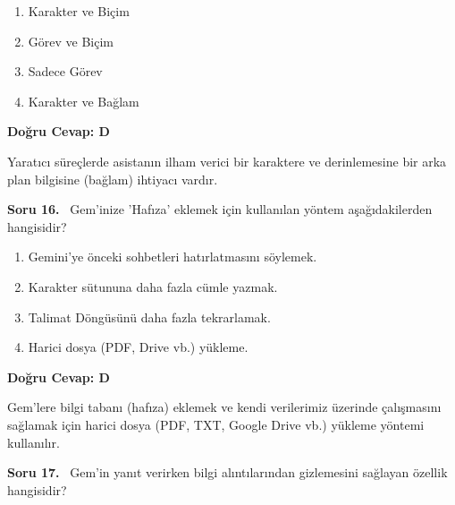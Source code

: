 \documentclass[11pt,a4paper,openany]{book}
\begin{document}
\begin{enumerate}[label=\Alph*), leftmargin=25pt, topsep=4pt, itemsep=2pt]
        \item Karakter ve Biçim
        \item Görev ve Biçim
        \item Sadece Görev
        \item Karakter ve Bağlam
\end{enumerate}

\vspace{4pt}
\begin{tcolorbox}[title=Cevap ve Açıklama, colback=gray!3!white, colframe=primarycolor!90!black, arc=2mm, fonttitle=\bfseries\sffamily, top=6pt, bottom=6pt]
    \textbf{Doğru Cevap: D}

    \vspace{2pt}
    Yaratıcı süreçlerde asistanın ilham verici bir karaktere ve derinlemesine bir arka plan bilgisine (bağlam) ihtiyacı vardır.
\end{tcolorbox}
\vspace{10pt}
\needspace{5cm}
\vspace{8pt}
\noindent\textbf{\large\sffamily Soru 16.} \ Gem'inize 'Hafıza' eklemek için kullanılan yöntem aşağıdakilerden hangisidir?

\begin{enumerate}[label=\Alph*), leftmargin=25pt, topsep=4pt, itemsep=2pt]
        \item Gemini'ye önceki sohbetleri hatırlatmasını söylemek.
        \item Karakter sütununa daha fazla cümle yazmak.
        \item Talimat Döngüsünü daha fazla tekrarlamak.
        \item Harici dosya (PDF, Drive vb.) yükleme.
\end{enumerate}

\vspace{4pt}
\begin{tcolorbox}[title=Cevap ve Açıklama, colback=gray!3!white, colframe=primarycolor!90!black, arc=2mm, fonttitle=\bfseries\sffamily, top=6pt, bottom=6pt]
    \textbf{Doğru Cevap: D}

    \vspace{2pt}
    Gem'lere bilgi tabanı (hafıza) eklemek ve kendi verilerimiz üzerinde çalışmasını sağlamak için harici dosya (PDF, TXT, Google Drive vb.) yükleme yöntemi kullanılır.
\end{tcolorbox}
\vspace{10pt}
\needspace{5cm}
\vspace{8pt}
\noindent\textbf{\large\sffamily Soru 17.} \ Gem'in yanıt verirken bilgi alıntılarından gizlemesini sağlayan özellik hangisidir?
\end{document}
